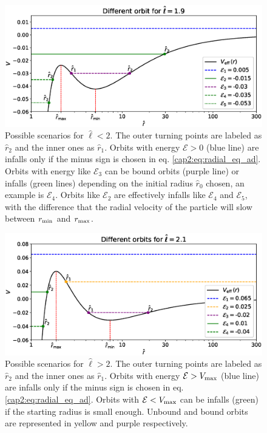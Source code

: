 \begin{figure}
    \centering
    \includegraphics[width=\textwidth]{Figures/chapter2/scenario1.eps}
    \caption{Possible scenarios for $\hat \ell < 2$.
    The outer turning points are labeled as $\hat r_2$ and the inner ones as
    $\hat r_1$.
    Orbits with energy $\mathcal E > 0$ (blue line) are infalls only if the
    minus sign is chosen in eq. \ref{cap2:eq:radial_eq_ad}.
    Orbits with energy like $\mathcal E_3$ can be bound orbits (purple line) or
    infalls (green lines) depending on the initial radius $\hat r_0$ chosen, an
    example is $\mathcal E_4$.
    Orbits like $\mathcal E_2$ are effectively infalls like $\mathcal E_4$ and
    $\mathcal E_5$, with the difference that the radial velocity of the particle
    will slow between $r_{\rm min}$ and $r_{\rm max}$.}
    \label{cap2:fig:scenario1}
\end{figure}

\begin{figure} \centering \includegraphics[width=\textwidth]{Figures/chapter2/scenario2.eps}
    \caption{Possible scenarios for $\hat \ell > 2$.
    The outer turning points are labeled as $\hat r_2$ and the inner ones as
    $\hat r_1$.
    Orbits with energy $\mathcal E > V_{\rm max}$ (blue line) are infalls only
    if the minus sign is chosen in eq. \ref{cap2:eq:radial_eq_ad}.
    Orbits with $\mathcal E < V_{\rm max}$ can be infalls (green) if the
    starting radius is small enough.
    Unbound and bound orbits are represented in yellow and purple respectively.}
    \label{cap2:fig:scenario2}
\end{figure}


